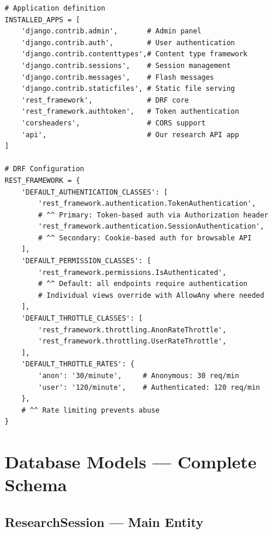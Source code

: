 \documentclass[11pt,a4paper,twoside]{report}
\begin{document}
\begin{lstlisting}[style=pythonstyle,caption={backend/orchestrator\_backend/settings.py}]
# Application definition
INSTALLED_APPS = [
    'django.contrib.admin',       # Admin panel
    'django.contrib.auth',        # User authentication
    'django.contrib.contenttypes',# Content type framework
    'django.contrib.sessions',    # Session management
    'django.contrib.messages',    # Flash messages
    'django.contrib.staticfiles', # Static file serving
    'rest_framework',             # DRF core
    'rest_framework.authtoken',   # Token authentication
    'corsheaders',                # CORS support
    'api',                        # Our research API app
]

# DRF Configuration
REST_FRAMEWORK = {
    'DEFAULT_AUTHENTICATION_CLASSES': [
        'rest_framework.authentication.TokenAuthentication',
        # ^^ Primary: Token-based auth via Authorization header
        'rest_framework.authentication.SessionAuthentication',
        # ^^ Secondary: Cookie-based auth for browsable API
    ],
    'DEFAULT_PERMISSION_CLASSES': [
        'rest_framework.permissions.IsAuthenticated',
        # ^^ Default: all endpoints require authentication
        # Individual views override with AllowAny where needed
    ],
    'DEFAULT_THROTTLE_CLASSES': [
        'rest_framework.throttling.AnonRateThrottle',
        'rest_framework.throttling.UserRateThrottle',
    ],
    'DEFAULT_THROTTLE_RATES': {
        'anon': '30/minute',     # Anonymous: 30 req/min
        'user': '120/minute',    # Authenticated: 120 req/min
    },
    # ^^ Rate limiting prevents abuse
}
\end{lstlisting}

\section{Database Models --- Complete Schema}

\subsection{ResearchSession --- Main Entity}
\end{document}
